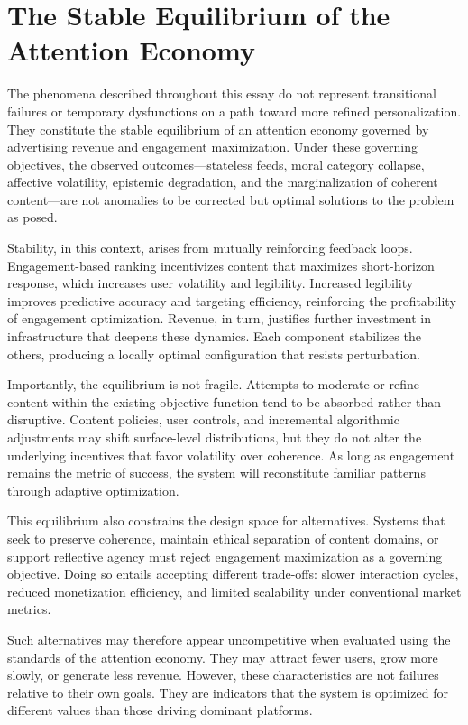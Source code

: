 \documentclass[12pt]{article}
\begin{document}
\section{The Stable Equilibrium of the Attention Economy}

The phenomena described throughout this essay do not represent transitional failures or temporary dysfunctions on a path toward more refined personalization. They constitute the stable equilibrium of an attention economy governed by advertising revenue and engagement maximization. Under these governing objectives, the observed outcomes—stateless feeds, moral category collapse, affective volatility, epistemic degradation, and the marginalization of coherent content—are not anomalies to be corrected but optimal solutions to the problem as posed.

Stability, in this context, arises from mutually reinforcing feedback loops. Engagement-based ranking incentivizes content that maximizes short-horizon response, which increases user volatility and legibility. Increased legibility improves predictive accuracy and targeting efficiency, reinforcing the profitability of engagement optimization. Revenue, in turn, justifies further investment in infrastructure that deepens these dynamics. Each component stabilizes the others, producing a locally optimal configuration that resists perturbation.

Importantly, the equilibrium is not fragile. Attempts to moderate or refine content within the existing objective function tend to be absorbed rather than disruptive. Content policies, user controls, and incremental algorithmic adjustments may shift surface-level distributions, but they do not alter the underlying incentives that favor volatility over coherence. As long as engagement remains the metric of success, the system will reconstitute familiar patterns through adaptive optimization.

This equilibrium also constrains the design space for alternatives. Systems that seek to preserve coherence, maintain ethical separation of content domains, or support reflective agency must reject engagement maximization as a governing objective. Doing so entails accepting different trade-offs: slower interaction cycles, reduced monetization efficiency, and limited scalability under conventional market metrics.

Such alternatives may therefore appear uncompetitive when evaluated using the standards of the attention economy. They may attract fewer users, grow more slowly, or generate less revenue. However, these characteristics are not failures relative to their own goals. They are indicators that the system is optimized for different values than those driving dominant platforms.
\end{document}

